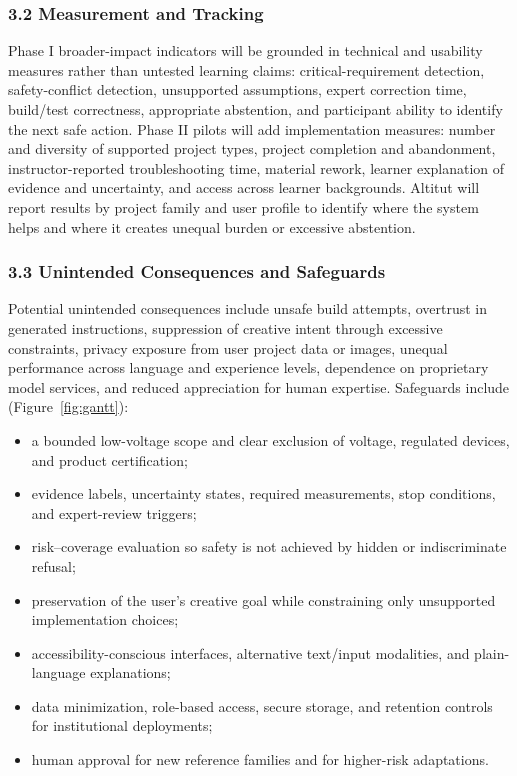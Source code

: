 \documentclass[11pt,letterpaper]{article}
\begin{document}
\subsubsection*{3.2 Measurement and Tracking}
Phase I broader-impact indicators will be grounded in technical and usability measures rather than untested learning claims: critical-requirement detection, safety-conflict detection, unsupported assumptions, expert correction time, build/test correctness, appropriate abstention, and participant ability to identify the next safe action. Phase II pilots will add implementation measures: number and diversity of supported project types, project completion and abandonment, instructor-reported troubleshooting time, material rework, learner explanation of evidence and uncertainty, and access across learner backgrounds. Altitut will report results by project family and user profile to identify where the system helps and where it creates unequal burden or excessive abstention.

\subsubsection*{3.3 Unintended Consequences and Safeguards}
Potential unintended consequences include unsafe build attempts, overtrust in generated instructions, suppression of creative intent through excessive constraints, privacy exposure from user project data or images, unequal performance across language and experience levels, dependence on proprietary model services, and reduced appreciation for human expertise. Safeguards include (Figure~\ref{fig:gantt}):
\begin{itemize}
\item a bounded low-voltage scope and clear exclusion of voltage, regulated devices, and product certification;
\item evidence labels, uncertainty states, required measurements, stop conditions, and expert-review triggers;
\item risk--coverage evaluation so safety is not achieved by hidden or indiscriminate refusal;
\item preservation of the user's creative goal while constraining only unsupported implementation choices;
\item accessibility-conscious interfaces, alternative text/input modalities, and plain-language explanations;
\item data minimization, role-based access, secure storage, and retention controls for institutional deployments;
\item human approval for new reference families and for higher-risk adaptations.
\end{itemize}
\end{document}
